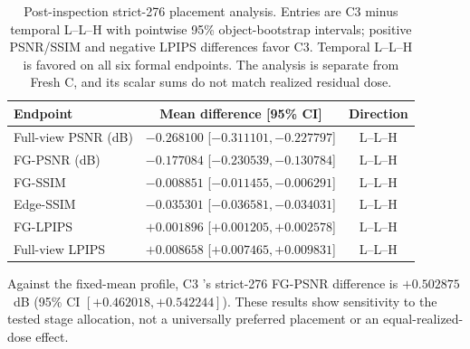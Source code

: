 \documentclass[times,twocolumn,final]{elsarticle}
\providecommand{\DIFadd}[1]{{\protect\color{blue} \sf #1}} %
\providecommand{\DIFaddbegin}{} %
\providecommand{\DIFaddend}{} %
\providecommand{\DIFaddFL}[1]{\DIFadd{#1}} %
\providecommand{\DIFaddbeginFL}{\DIFaddbegin} %
\providecommand{\DIFaddendFL}{\DIFaddend} %
\renewcommand{\DIFaddbeginFL}{}
\renewcommand{\DIFaddendFL}{}
\renewcommand{\DIFaddFL}[1]{#1}
\begin{document}
  \DIFaddbeginFL \begin{table}[t]
\DIFaddendFL \centering
  \DIFaddbeginFL \scriptsize
\DIFaddendFL \setlength{\tabcolsep}{4pt}
  \DIFaddbeginFL \caption{Post-inspection strict-276 placement analysis. Entries are C3 minus temporal L--L--H with pointwise 95\% object-bootstrap intervals; positive PSNR/SSIM and negative LPIPS differences favor C3. Temporal L--L--H is favored on all six formal endpoints. The analysis is separate from Fresh C, and its scalar sums do not match realized residual dose.}
\label{tab:temporal-placement}
\begin{tabular}{lcc}
\DIFaddendFL \toprule
  \DIFaddbeginFL \DIFaddFL{Endpoint }\DIFaddendFL &   \DIFaddbeginFL \DIFaddFL{Mean difference }[\DIFaddFL{95\% CI}] \DIFaddendFL &   \DIFaddbeginFL \DIFaddFL{Direction }\DIFaddendFL \\
\midrule
  \DIFaddbeginFL \DIFaddFL{Full-view PSNR (dB) }\DIFaddendFL &   \DIFaddbeginFL \DIFaddFL{$-0.268100$ }[\DIFaddFL{$-0.311101,-0.227797$}] \DIFaddendFL &   \DIFaddbeginFL \DIFaddFL{L--L--H }\\
\DIFaddFL{FG-PSNR (dB) }\DIFaddendFL &   \DIFaddbeginFL \DIFaddFL{$-0.177084$ }[\DIFaddFL{$-0.230539,-0.130784$}] \DIFaddendFL &   \DIFaddbeginFL \DIFaddFL{L--L--H }\DIFaddendFL \\
  \DIFaddbeginFL \DIFaddFL{FG-SSIM }\DIFaddendFL &   \DIFaddbeginFL \DIFaddFL{$-0.008851$ }[\DIFaddFL{$-0.011455,-0.006291$}] \DIFaddendFL &   \DIFaddbeginFL \DIFaddFL{L--L--H }\\
\DIFaddFL{Edge-SSIM }\DIFaddendFL &   \DIFaddbeginFL \DIFaddFL{$-0.035301$ }[\DIFaddFL{$-0.036581,-0.034031$}] \DIFaddendFL &   \DIFaddbeginFL \DIFaddFL{L--L--H }\DIFaddendFL \\
  \DIFaddbeginFL \DIFaddFL{FG-LPIPS }\DIFaddendFL &   \DIFaddbeginFL \DIFaddFL{$+0.001896$ }[\DIFaddFL{$+0.001205,+0.002578$}] \DIFaddendFL &   \DIFaddbeginFL \DIFaddFL{L--L--H }\\
\DIFaddFL{Full-view LPIPS }\DIFaddendFL &   \DIFaddbeginFL \DIFaddFL{$+0.008658$ }[\DIFaddFL{$+0.007465,+0.009831$}] \DIFaddendFL &   \DIFaddbeginFL \DIFaddFL{L--L--H }\DIFaddendFL \\
\bottomrule
\end{tabular}
  \DIFaddbegin \end{table}
\DIFaddend 

  \DIFaddbegin \DIFadd{Against the fixed-mean profile, }\DIFaddend C3  \DIFaddbegin \DIFadd{'s strict-276 FG-PSNR difference is $+0.502875$~dB (95\% CI $[+0.462018,+0.542244]$). These results show sensitivity to the tested stage allocation, not a universally preferred placement or an equal-realized-dose effect}\DIFaddend .
\end{document}

